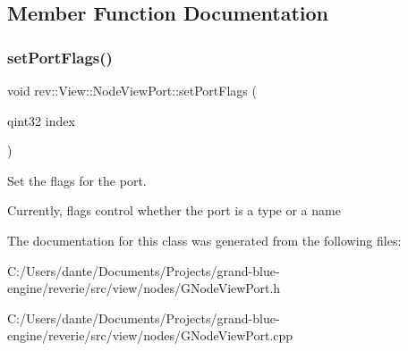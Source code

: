 \subsection{Member Function Documentation}
\mbox{\label{classrev_1_1_view_1_1_node_view_port_a2d80923d0c891ffa3a233d3e008dc289}} 
\subsubsection{\texorpdfstring{setPortFlags()}{setPortFlags()}}
{\footnotesize\ttfamily void rev\+::\+View\+::\+Node\+View\+Port\+::set\+Port\+Flags (\begin{DoxyParamCaption}\item[{qint32}]{index }\end{DoxyParamCaption})\hspace{0.3cm}{\ttfamily [virtual]}}



Set the flags for the port. 

Currently, flags control whether the port is a type or a name 

The documentation for this class was generated from the following files\+:\begin{DoxyCompactItemize}
\item 
C\+:/\+Users/dante/\+Documents/\+Projects/grand-\/blue-\/engine/reverie/src/view/nodes/G\+Node\+View\+Port.\+h\item 
C\+:/\+Users/dante/\+Documents/\+Projects/grand-\/blue-\/engine/reverie/src/view/nodes/G\+Node\+View\+Port.\+cpp\end{DoxyCompactItemize}
